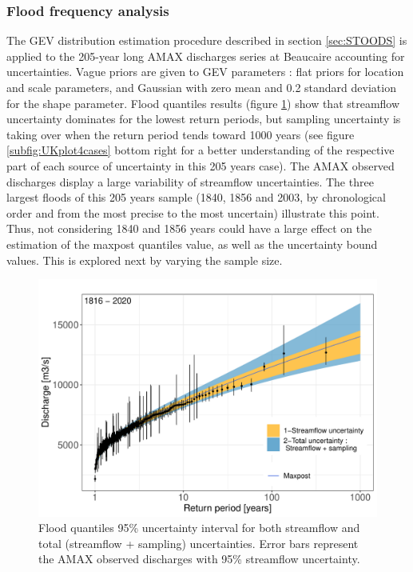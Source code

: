 \documentclass[11pt]{article}
\begin{document}
        \subsubsection{Flood frequency analysis}
        
       The GEV distribution estimation procedure described in section \ref{sec:STOODS} is applied to the 205-year long AMAX discharges series at Beaucaire accounting for uncertainties. Vague priors are given to GEV parameters : flat priors for location and scale parameters, and Gaussian with zero mean and 0.2 standard deviation for the shape parameter.
       Flood quantiles results (figure \ref{fig:GEV205y}) show that streamflow uncertainty dominates for the lowest return periods, but sampling uncertainty is taking over when the return period tends toward 1000 years (see figure \ref{subfig:UKplot4cases} bottom right  for a better understanding of the respective part of each source of uncertainty in this 205 years case). The AMAX observed discharges display a large variability of streamflow uncertainties. The three largest floods of this 205 years sample (1840, 1856 and 2003, by chronological order and from the most precise to the most uncertain) illustrate this point. Thus, not considering 1840 and 1856 years could have a large effect on the estimation of the maxpost quantiles value, as well as the uncertainty bound values. This is explored next by varying the sample size.
       
       \begin{figure}[h!]
            \centering
            \includegraphics[width=0.7\linewidth]{Figs/10-GeV_205years.pdf}
            \caption{Flood quantiles 95\% uncertainty interval for both streamflow and total (streamflow + sampling) uncertainties. Error bars represent the AMAX observed discharges with 95\% streamflow uncertainty.}
            \label{fig:GEV205y}
        \end{figure}            
        
\end{document}
